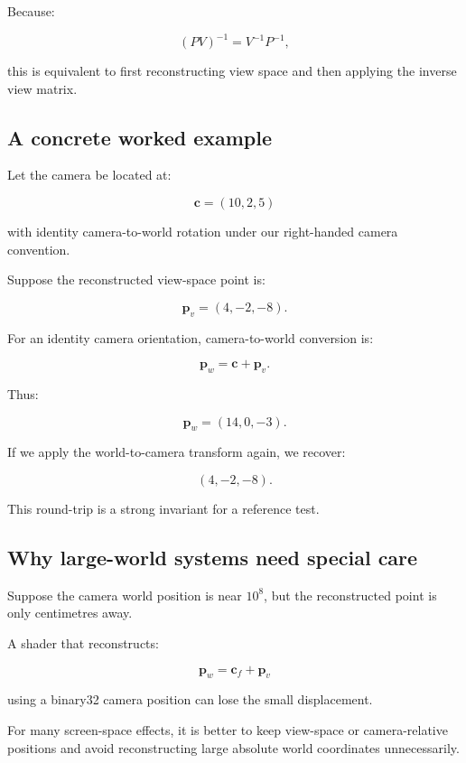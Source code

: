 Because:

\[ (PV)^{-1}=V^{-1}P^{-1}, \]

this is equivalent to first reconstructing view space and then applying the inverse view matrix.

\subsection{A concrete worked example}\label{02-foundations-ii-ch035-a-concrete-worked-example}

\hypertarget{02-foundations-ii-ch035-a-concrete-worked-example}{}

Let the camera be located at:

\[ \mathbf c=(10,2,5) \]

with identity camera-to-world rotation under our right-handed camera convention.

Suppose the reconstructed view-space point is:

\[ \mathbf p_v=(4,-2,-8). \]

For an identity camera orientation, camera-to-world conversion is:

\[ \mathbf p_w=\mathbf c+\mathbf p_v. \]

Thus:

\[ \boxed{ \mathbf p_w=(14,0,-3). } \]

If we apply the world-to-camera transform again, we recover:

\[ (4,-2,-8). \]

This round-trip is a strong invariant for a reference test.

\subsection{Why large-world systems need special care}\label{02-foundations-ii-ch035-why-large-world-systems-need-special-care}

\hypertarget{02-foundations-ii-ch035-why-large-world-systems-need-special-care}{}

Suppose the camera world position is near \(10^8\), but the reconstructed point is only centimetres away.

A shader that reconstructs:

\[ \mathbf p_w=\mathbf c_f+\mathbf p_v \]

using a binary32 camera position can lose the small displacement.

For many screen-space effects, it is better to keep view-space or camera-relative positions and avoid reconstructing large absolute world coordinates unnecessarily.

